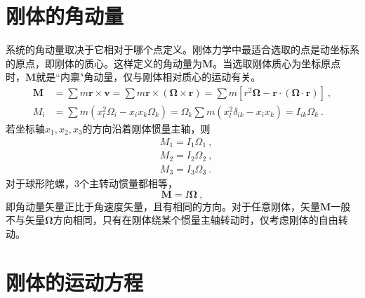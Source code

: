 \documentclass[11pt,a4paper]{article}
\renewcommand{\vec}[1]{\boldsymbol{#1}}
\begin{document}
\section{刚体的角动量}
系统的角动量取决于它相对于哪个点定义。刚体力学中最适合选取的点是动坐标系的原点，即刚体的质心。这样定义的角动量为$\vec{M}$。当选取刚体质心为坐标原点时，$\vec{M}$就是``内禀"角动量，仅与刚体相对质心的运动有关。
\begin{align*}
\vec{M} &= \sum m \vec{r} \times \vec{v} = \sum m \vec{r} \times (\vec{\Omega} \times \vec{r}) = \sum m [r^2 \vec{\Omega} -\vec{r} \cdot (\vec{\Omega} \cdot \vec{r}) ] ~, \\
M_i &= \sum m (x_l^2 \Omega_i - x_i x_k \Omega_k) = \Omega_k \sum m (x_l^2 \delta_{ik} - x_i x_k) = I_{ik}\Omega_k ~.
\end{align*}
若坐标轴$x_1, x_2, x_3$的方向沿着刚体惯量主轴，则
\begin{align}
\nonumber & M_1 = I_1 \Omega_1 ~, \\
\nonumber & M_2 = I_2 \Omega_2 ~, \\ 
& M_3 = I_3 \Omega_3 ~.
\end{align}
对于球形陀螺，$3$个主转动惯量都相等，
\begin{equation}
\vec{M} = I \vec{\Omega} ~,
\end{equation}
即角动量矢量正比于角速度矢量，且有相同的方向。对于任意刚体，矢量$\vec{M}$一般不与矢量$\vec{\Omega}$方向相同，只有在刚体绕某个惯量主轴转动时，仅考虑刚体的自由转动。































\section{刚体的运动方程}
\end{document}
